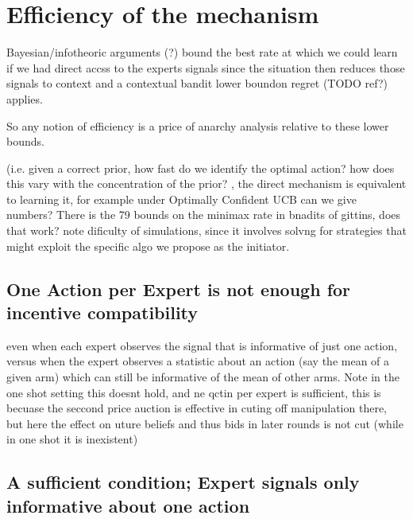 




\section{Efficiency of the mechanism}



Bayesian/infotheoric arguments  (?)  bound the best rate at which we could learn if we had direct accss to the experts signals since the situation then reduces those signals to context and a contextual bandit lower boundon regret (TODO ref?) applies. 

So any notion of efficiency is a price of anarchy analysis relative to these lower bounds. 

(i.e. given a correct prior, how fast do we identify the optimal action? how does this vary with the concentration of the prior? , the direct mechanism is equivalent to learning it, for example under Optimally Confident UCB can we give numbers? There is the 79 bounds on the minimax rate in bnadits of gittins, does that work? note dificulty of simulations, since it involves solvng for strategies that might exploit the specific algo we propose as the initiator.

\subsection{One Action per Expert is not enough for incentive compatibility}

even when each expert observes the signal that is informative of just one action, versus when the expert observes a statistic about an action (say the mean of a given arm) which can still be informative of the mean of other arms. Note in the one shot setting this doesnt hold, and ne qctin per expert is sufficient, this is becuase the seccond price auction is effective in cuting off manipulation there, but here the effect on uture beliefs and thus bids in later rounds is not cut (while in one shot it is inexistent)

\subsection{A sufficient condition; Expert signals only informative about one action}

